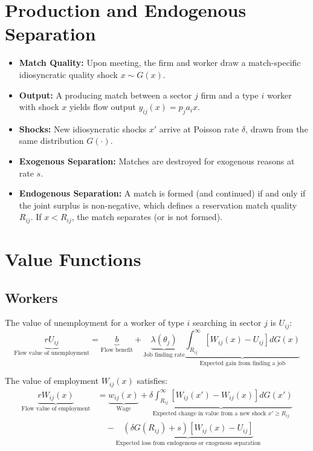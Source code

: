 \documentclass[11pt]{article}
\begin{document}
\section{Production and Endogenous Separation}
\begin{itemize}
    \item \textbf{Match Quality:} Upon meeting, the firm and worker draw a match-specific idiosyncratic quality shock $x \sim G(x)$.
    \item \textbf{Output:} A producing match between a sector $j$ firm and a type $i$ worker with shock $x$ yields flow output $y_{ij}(x) = p_j a_i x$.
    \item \textbf{Shocks:} New idiosyncratic shocks $x'$ arrive at Poisson rate $\delta$, drawn from the same distribution $G(\cdot)$.
    \item \textbf{Exogenous Separation:} Matches are destroyed for exogenous reasons at rate $s$.
    \item \textbf{Endogenous Separation:} A match is formed (and continued) if and only if the joint surplus is non-negative, which defines a reservation match quality $R_{ij}$. If $x < R_{ij}$, the match separates (or is not formed).
\end{itemize}

\section{Value Functions}

\subsection{Workers}
The value of unemployment for a worker of type $i$ searching in sector $j$ is $U_{ij}$:
\begin{equation}
\underbrace{r U_{ij}}_{\text{Flow value of unemployment}} = \underbrace{b}_{\text{Flow benefit}} + \underbrace{\lambda(\theta_j)}_{\text{Job finding rate}} \underbrace{\int_{R_{ij}}^\infty [W_{ij}(x) - U_{ij}] dG(x)}_{\text{Expected gain from finding a job}}
\end{equation}

The value of employment $W_{ij}(x)$ satisfies:
\begin{equation}
\begin{aligned}
\underbrace{r W_{ij}(x)}_{\text{Flow value of employment}} &= \underbrace{w_{ij}(x)}_{\text{Wage}} + \underbrace{\delta \int_{R_{ij}}^\infty [W_{ij}(x') - W_{ij}(x)] dG(x')}_{\text{Expected change in value from a new shock $x' \ge R_{ij}$}} \\
&\quad - \underbrace{(\delta G(R_{ij}) + s) [W_{ij}(x) - U_{ij}]}_{\text{Expected loss from endogenous or exogenous separation}}
\end{aligned}
\end{equation}
\end{document}
